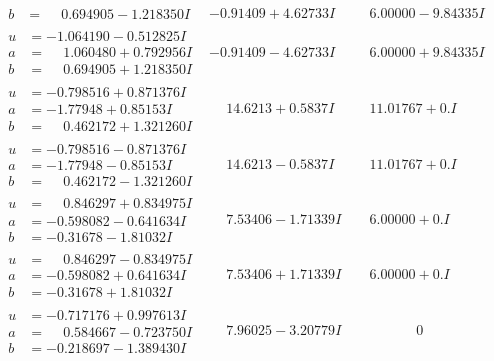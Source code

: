 \documentclass[1p]{elsarticle_modified}
\theoremstyle{definition}
\begin{document}
$$\begin{array}{c|c|c}
\begin{aligned}
b &= \phantom{-}0.694905 - 1.218350 I\end{aligned}
 & -0.91409 + 4.62733 I & \phantom{-}6.00000 - 9.84335 I \\ \hline\begin{aligned}
u &= -1.064190 - 0.512825 I \\
a &= \phantom{-}1.060480 + 0.792956 I \\
b &= \phantom{-}0.694905 + 1.218350 I\end{aligned}
 & -0.91409 - 4.62733 I & \phantom{-}6.00000 + 9.84335 I \\ \hline\begin{aligned}
u &= -0.798516 + 0.871376 I \\
a &= -1.77948 + 0.85153 I \\
b &= \phantom{-}0.462172 + 1.321260 I\end{aligned}
 & \phantom{-}14.6213 + 0.5837 I & \phantom{-}11.01767 + 0. I\phantom{ +0.000000I} \\ \hline\begin{aligned}
u &= -0.798516 - 0.871376 I \\
a &= -1.77948 - 0.85153 I \\
b &= \phantom{-}0.462172 - 1.321260 I\end{aligned}
 & \phantom{-}14.6213 - 0.5837 I & \phantom{-}11.01767 + 0. I\phantom{ +0.000000I} \\ \hline\begin{aligned}
u &= \phantom{-}0.846297 + 0.834975 I \\
a &= -0.598082 - 0.641634 I \\
b &= -0.31678 - 1.81032 I\end{aligned}
 & \phantom{-}7.53406 - 1.71339 I & \phantom{-}6.00000 + 0. I\phantom{ +0.000000I} \\ \hline\begin{aligned}
u &= \phantom{-}0.846297 - 0.834975 I \\
a &= -0.598082 + 0.641634 I \\
b &= -0.31678 + 1.81032 I\end{aligned}
 & \phantom{-}7.53406 + 1.71339 I & \phantom{-}6.00000 + 0. I\phantom{ +0.000000I} \\ \hline\begin{aligned}
u &= -0.717176 + 0.997613 I \\
a &= \phantom{-}0.584667 - 0.723750 I \\
b &= -0.218697 - 1.389430 I\end{aligned}
 & \phantom{-}7.96025 - 3.20779 I & \phantom{-0.000000 } 0 \\ \hline\begin{aligned}

\end{aligned}
\end{array}$$
\end{document}
